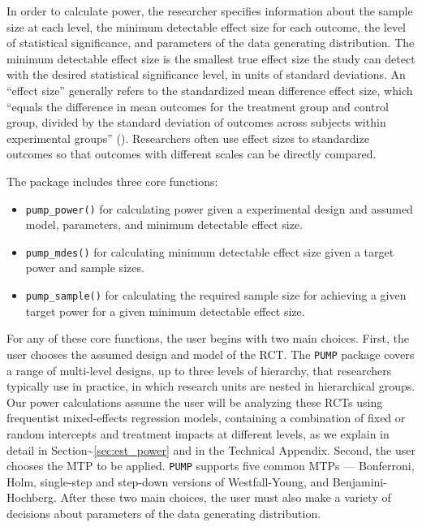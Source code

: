 \documentclass[
]{jss}
\providecommand{\tightlist}{%
  \setlength{\itemsep}{0pt}\setlength{\parskip}{0pt}}
\begin{document}
In order to calculate power, the researcher specifies information about
the sample size at each level, the minimum detectable effect size for
each outcome, the level of statistical significance, and parameters of
the data generating distribution. The minimum detectable effect size is
the smallest true effect size the study can detect with the desired
statistical significance level, in units of standard deviations. An
``effect size'' generally refers to the standardized mean difference
effect size, which ``equals the difference in mean outcomes for the
treatment group and control group, divided by the standard deviation of
outcomes across subjects within experimental groups'' (\citet{RN27978}).
Researchers often use effect sizes to standardize outcomes so that
outcomes with different scales can be directly compared.

The package includes three core functions:

\begin{itemize}
\tightlist
\item
  \texttt{pump\_power()} for calculating power given a experimental
  design and assumed model, parameters, and minimum detectable effect
  size.
\item
  \texttt{pump\_mdes()} for calculating minimum detectable effect size
  given a target power and sample sizes.
\item
  \texttt{pump\_sample()} for calculating the required sample size for
  achieving a given target power for a given minimum detectable effect
  size.
\end{itemize}

For any of these core functions, the user begins with two main choices.
First, the user chooses the assumed design and model of the RCT. The
\texttt{PUMP} package covers a range of multi-level designs, up to three
levels of hierarchy, that researchers typically use in practice, in
which research units are nested in hierarchical groups. Our power
calculations assume the user will be analyzing these RCTs using
frequentist mixed-effects regression models, containing a combination of
fixed or random intercepts and treatment impacts at different levels, as
we explain in detail in Section\textasciitilde{}\ref{sec:est_power} and
in the Technical Appendix. Second, the user chooses the MTP to be
applied. \texttt{PUMP} supports five common MTPs --- Bonferroni, Holm,
single-step and step-down versions of Westfall-Young, and
Benjamini-Hochberg. After these two main choices, the user must also
make a variety of decisions about parameters of the data generating
distribution.
\end{document}
